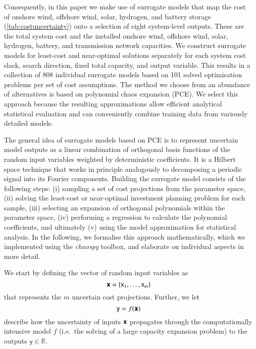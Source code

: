 
Consequently, in this paper we make use of surrogate models that map the cost of
onshore wind, offshore wind, solar, hydrogen, and battery storage
(\cref{tab:costuncertainty}) onto a selection of eight system-level outputs.
These are the total system cost and the installed onshore wind, offshore wind,
solar, hydrogen, battery, and transmission network capacities. We construct
surrogate models for least-cost and near-optimal solutions separately for each
system cost slack, search direction, fixed total capacity, and output variable.
This results in a collection of 808 individual surrogate models based on 101
solved optimisation problems per set of cost assumptions. The method we choose
from an abundance of alternatives is based on polynomial chaos expansion (PCE).
\cite{sudret_global_2008,fajraoui_optimal_2017,gratiet_metamodel-based_2015} We
select this approach because the resulting approximations allow efficient
analytical statistical evaluation\cite{sudret_global_2008} and can conveniently
combine training data from variously detailed models.\cite{palar_multi-fidelity_2016}


The general idea of surrogate models based on PCE is to
represent uncertain model outputs as a linear combination of orthogonal basis functions
of the random input variables weighted by deterministic coefficients.\cite{muhlpfordt_uncertainty_2020}
It is a Hilbert space technique that works in principle analogously to decomposing a periodic signal into its Fourier components.\cite{muhlpfordt_uncertainty_2020}
Building the surrogate model consists of the following steps:
(i) sampling a set of cost projections from the parameter space,
(ii) solving the least-cost or near-optimal investment planning problem for each sample,
(iii) selecting an expansion of orthogonal polynomials within the parameter space,
(iv) performing a regression to calculate the polynomial coefficients, and ultimately
(v) using the model approximation for statistical analysis.
In the following, we formalise this approach mathematically,
which we implemented using the \textit{chaospy} toolbox,\cite{feinberg_chaospy_2015}
and elaborate on individual aspects in more detail.

We start by defining the vector of random input variables as
\begin{equation}
    \boldsymbol{\mathsf{x}} = \{\mathsf{x}_1, \dots , \mathsf{x}_m\}
\end{equation}
that represents the $m$ uncertain cost projections.
Further, we let
\begin{equation}
    \mathsf{y} = f(\boldsymbol{\mathsf{x}})
\end{equation}
describe how the uncertainty of inputs $\boldsymbol{\mathsf{x}}$ propagates
through the computationally intensive model $f$
(i.e.~the solving of a large capacity expansion problem)
to the outputs $\mathsf{y} \in \mathbb{R}$.

